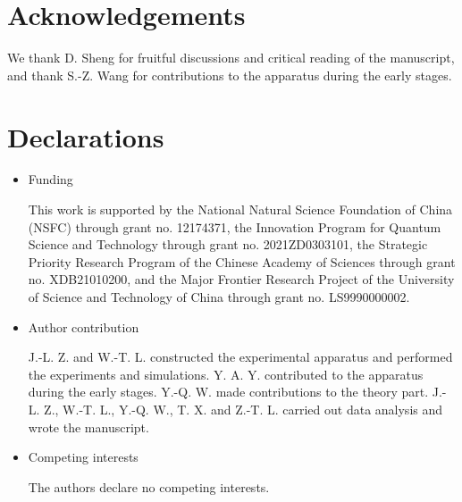 \documentclass[pdflatex,sn-nature,centre]{sn-jnl}%
\begin{document}
\section*{Acknowledgements}
We thank D. Sheng for fruitful discussions and critical reading of the manuscript, and thank S.-Z. Wang for contributions to the apparatus during the early stages. 

\section*{Declarations}


\begin{itemize}
\item Funding

This work is supported by the National Natural Science Foundation of China (NSFC) through grant no. 12174371, the Innovation Program for Quantum Science and Technology through grant no. 2021ZD0303101, the Strategic Priority Research Program of the Chinese Academy of Sciences through grant no. XDB21010200, and the Major Frontier Research Project of the University of Science and Technology of China through grant no. LS9990000002.

\item Author contribution

J.-L. Z. and W.-T. L. constructed the experimental apparatus and performed the experiments and simulations. Y. A. Y. contributed to the apparatus during the early stages. Y.-Q. W. made contributions to the theory part. J.-L. Z., W.-T. L., Y.-Q. W., T. X. and Z.-T. L. carried out data analysis and wrote the manuscript.

\item Competing interests

The authors declare no competing interests.

\end{itemize}
\end{document}

